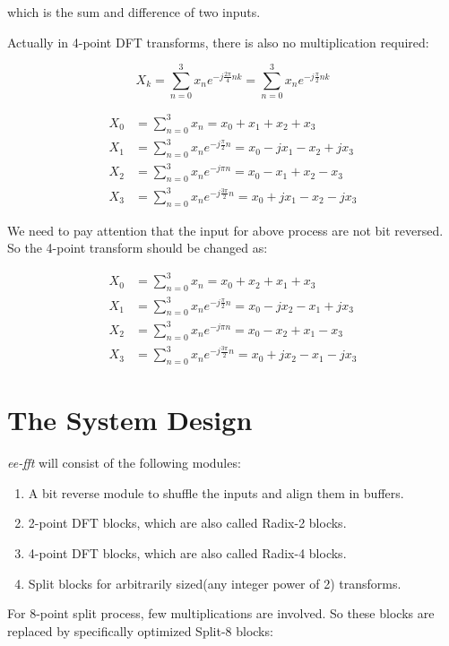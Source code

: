 \documentclass[a4paper]{report}
\begin{document}
	which is the sum and difference of two inputs.
	
	\bigskip
	
	Actually in 4-point DFT transforms, there is also no multiplication required:

\[X_k = \sum_{n=0}^{3} x_n e^{-j\frac{2\pi}{4}nk} = \sum_{n=0}^{3} x_n e^{-j\frac{\pi}{2}nk} \]

\begin{align*}
X_0 &= \sum_{n=0}^{3} x_n = x_0 + x_1 + x_2 + x_3 \\
X_1 &= \sum_{n=0}^{3} x_n e^{-j\frac{\pi}{2}n} = x_0 - jx_1 - x_2 + jx_3 \\
X_2 &= \sum_{n=0}^{3} x_n e^{-j\pi n} = x_0 - x_1 + x_2 - x_3 \\
X_3 &= \sum_{n=0}^{3} x_n e^{-j\frac{3\pi}{2} n} = x_0 + jx_1 - x_2 - jx_3
\end{align*}

	We need to pay attention that the input for above process are not bit reversed. So the 4-point transform should be changed as:
	
\begin{align*}
X_0 &= \sum_{n=0}^{3} x_n = x_0 + x_2 + x_1 + x_3 \\
X_1 &= \sum_{n=0}^{3} x_n e^{-j\frac{\pi}{2}n} = x_0 - jx_2 - x_1 + jx_3 \\
X_2 &= \sum_{n=0}^{3} x_n e^{-j\pi n} = x_0 - x_2 + x_1 - x_3 \\
X_3 &= \sum_{n=0}^{3} x_n e^{-j\frac{3\pi}{2} n} = x_0 + jx_2 - x_1 - jx_3
\end{align*}

\section{The System Design} \indent

	\textit{ee-fft} will consist of the following modules:
	
	\begin{enumerate}
		\item A bit reverse module to shuffle the inputs and align them in buffers.
		\item 2-point DFT blocks, which are also called Radix-2 blocks.
		\item 4-point DFT blocks, which are also called Radix-4 blocks.
		\item Split blocks for arbitrarily sized(any integer power of 2) transforms.
	\end{enumerate}
	
	For 8-point split process, few multiplications are involved. So these blocks are replaced by specifically optimized Split-8 blocks:
\end{document}

